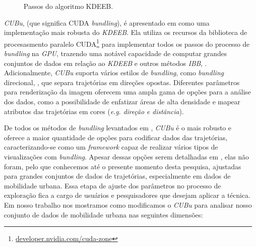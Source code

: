\begin{figure}[!ht]
\begin{center}
{
}
\end{center}
  \caption{Passos do algoritmo KDEEB.\label{fig:pipeline}}
\end{figure}


\emph{CUBu}, (que significa CUDA \emph{bundling}), é apresentado em \cite{zwan:16}
como uma implementação mais robusta do \emph{KDEEB}. Ela utiliza os recursos da biblioteca de procesasmento
paralelo CUDA\footnote{\url{developer.nvidia.com/cuda-zone}} para implementar
todos os passos do processo de \emph{bundling} na \emph{GPU}, trazendo uma notável capacidade
de computar grandes conjuntos de dados em relação ao \emph{KDEEB} e
outros métodos \emph{IBB}, \citet{adeb,lhuillier-fft:17}.
Adicionalmente, \emph{CUBu} suporta vários estilos de \emph{bundling},
como \emph{bundling} direcional, \citep{adeb}, que separa trajetórias
em direções opostas. Diferentes parâmetros para renderização da imagem oferecem
uma ampla gama de opções para a análise dos dados, como a possibilidade de
enfatizar áreas de alta densidade e mapear atributos das trajetórias
em cores (\emph{e.g. direção e distância}).
 
De todos os métodos de \emph{bundling} levantados em \cite{lhuillier:17},
\emph{CUBu} é o mais robusto e oferece a maior quantidade de opções para codificar
dados das trajetórias, caracterizando-se como um \emph{framework} capaz de realizar
vários tipos de visualizações com \emph{bundling}. Apesar dessas opções serem detalhadas em \cite{zwan:16},
elas não foram, pelo que conhecemos até o presente momento desta pesquisa, ajustadas para
grandes conjuntos de dados de trajetórias, especialmente em dados de mobilidade urbana.
Essa etapa de ajuste dos parâmetros no processo de exploração fica a cargo de usuários e pesquisadores
que desejam aplicar a técnica. Em nosso trabalho nos mostramos como modificamos
o \emph{CUBu} para analisar nosso conjunto de dados de mobilidade urbana nas seguintes
dimensões:

